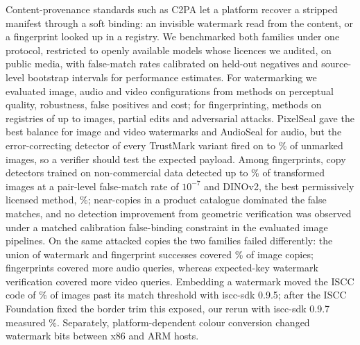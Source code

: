 Content-provenance standards such as C2PA let a platform recover a stripped manifest through a soft binding: an invisible watermark read from the content, or a fingerprint looked up in a registry. We benchmarked both families under one protocol, restricted to openly available models whose licences we audited, on public media, with false-match rates calibrated on held-out negatives and source-level bootstrap intervals for performance estimates. For watermarking we evaluated  image,  audio and  video configurations from  methods on perceptual quality, robustness, false positives and cost; for fingerprinting,  methods on registries of up to  images, partial edits and adversarial attacks. PixelSeal gave the best balance for image and video watermarks and AudioSeal for audio, but the error-correcting detector of every TrustMark variant fired on  to \% of unmarked images, so a verifier should test the expected payload. Among fingerprints, copy detectors trained on non-commercial data detected up to \% of transformed images at a pair-level false-match rate of $10^{-7}$ and DINOv2, the best permissively licensed method, \%; near-copies in a product catalogue dominated the false matches, and no detection improvement from geometric verification was observed under a matched calibration false-binding constraint in the evaluated image pipelines. On the same attacked copies the two families failed differently: the union of watermark and fingerprint successes covered \% of image copies; fingerprints covered more audio queries, whereas expected-key watermark verification covered more video queries. Embedding a watermark moved the ISCC code of \% of images past its match threshold with iscc-sdk 0.9.5; after the ISCC Foundation fixed the border trim this exposed, our rerun with iscc-sdk 0.9.7 measured \%. Separately, platform-dependent colour conversion changed watermark bits between x86 and ARM hosts.
